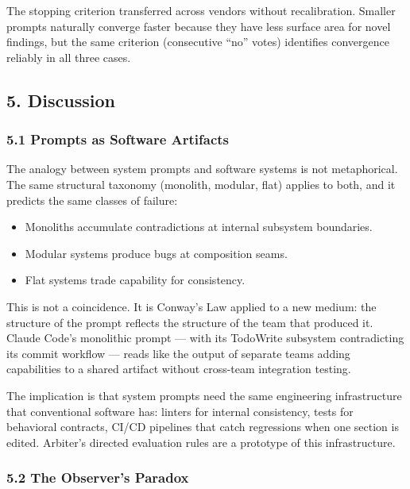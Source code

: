 \documentclass[
]{article}
\providecommand{\tightlist}{%
  \setlength{\itemsep}{0pt}\setlength{\parskip}{0pt}}
\begin{document}
The stopping criterion transferred across vendors without recalibration.
Smaller prompts naturally converge faster because they have less surface
area for novel findings, but the same criterion (consecutive ``no''
votes) identifies convergence reliably in all three cases.

\hypertarget{discussion}{%
\subsection{5. Discussion}\label{discussion}}

\hypertarget{prompts-as-software-artifacts}{%
\subsubsection{5.1 Prompts as Software
Artifacts}\label{prompts-as-software-artifacts}}

The analogy between system prompts and software systems is not
metaphorical. The same structural taxonomy (monolith, modular, flat)
applies to both, and it predicts the same classes of failure:

\begin{itemize}
\tightlist
\item
  Monoliths accumulate contradictions at internal subsystem boundaries.
\item
  Modular systems produce bugs at composition seams.
\item
  Flat systems trade capability for consistency.
\end{itemize}

This is not a coincidence. It is Conway's Law applied to a new medium:
the structure of the prompt reflects the structure of the team that
produced it. Claude Code's monolithic prompt --- with its TodoWrite
subsystem contradicting its commit workflow --- reads like the output of
separate teams adding capabilities to a shared artifact without
cross-team integration testing.

The implication is that system prompts need the same engineering
infrastructure that conventional software has: linters for internal
consistency, tests for behavioral contracts, CI/CD pipelines that catch
regressions when one section is edited. Arbiter's directed evaluation
rules are a prototype of this infrastructure.

\hypertarget{the-observers-paradox}{%
\subsubsection{5.2 The Observer's Paradox}\label{the-observers-paradox}}
\end{document}
